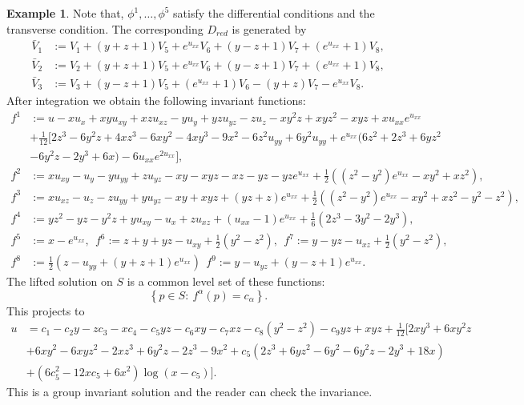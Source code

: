 \documentclass[a4paper, 11pt]{amsart}
\theoremstyle{definition}
\newtheorem{example}[theorem]{Example}
\begin{document}
\begin{example}
Note that, $\phi^1,\ldots,\phi^5$ satisfy the differential conditions and the transverse condition. The corresponding $D_{red}$ is generated by
\begin{align*}
\bar{V}_1&:=V_1+(y+z+1)V_5+e^{u_{xx}}V_6+(y-z+1)V_7+(e^{u_{xx}}+1)V_8,\\
\bar{V}_2&:=V_2+(y+z+1)V_5+e^{u_{xx}}V_6+(y-z+1)V_7+(e^{u_{xx}}+1)V_8,\\
\bar{V}_3&:=V_3+(y-z+1)V_5+(e^{u_{xx}}+1)V_6-(y+z)V_7-e^{u_{xx}}V_8.
\end{align*}
After integration we obtain the following invariant functions:
\begin{align*}
f^1&:=u-xu_x+xyu_{xy}+xzu_{xz}-yu_y+yzu_{yz}-zu_{z}-xy^2z+xyz^2-xyz+xu_{xx}e^{u_{xx}}\\
&+\frac{1}{12}[2z^3-6y^2z+4xz^3-6xy^2-4xy^3-9x^2-6z^2u_{yy}+6y^2u_{yy}+e^{u_{xx}}(6z^2+2z^3+6yz^2\\
&-6y^2z-2y^3+6x)-6u_{xx}e^{2u_{xx}}],\\
f^2&:=xu_{xy}-u_{y}-yu_{yy}+zu_{yz}-xy-xyz-xz-yz-yze^{u_{xx}}+\frac{1}{2}((z^2-y^2)e^{u_{xx}}-xy^2+xz^2),\\
f^3&:=xu_{xz}-u_{z}-zu_{yy}+yu_{yz}-xy+xyz+(yz+z)e^{u_{xx}}+\frac{1}{2}((z^2-y^2)e^{u_{xx}}-xy^2+xz^2-y^2-z^2),\\
f^4&:=yz^2-yz-y^2z+yu_{xy}-u_x+zu_{xz}+(u_{xx}-1)e^{u_{xx}}+\frac{1}{6}(2z^3-3y^2-2y^3),\\
f^5&:=x-e^{u_{xx}},~~f^6:=z+y+yz-u_{xy}+\frac{1}{2}(y^2-z^2),~~f^7:=y-yz-u_{xz}+\frac{1}{2}(y^2-z^2),\\
f^8&:=\frac{1}{2}(z-u_{yy}+(y+z+1)e^{u_{xx}})~~f^9:=y-u_{yz}+(y-z+1)e^{u_{xx}}.
\end{align*}
\noindent The lifted solution on $S$ is a common level set of these functions:
$$\left\{ p\in S:\ f^\alpha(p)=c_\alpha\right\}.$$
This projects to
 \begin{align*}
  u&=c_1-c_2y-zc_3-xc_4-c_5yz-c_6xy-c_7xz-c_8(y^2-z^2)-c_9yz+xyz+\frac{1}{12}[2xy^3+6xy^2z\\&+6xy^2-6xyz^2-2xz^3+6y^2z-2z^3-9x^2+c_5(2z^3+6yz^2-6y^2-6y^2z-2y^3+18x)\\
  &+(6c_5^2-12xc_5+6x^2)\log(x-c_5)].
\end{align*}
This is a group invariant solution and the reader can check the invariance.
\end{example}
\end{document}
